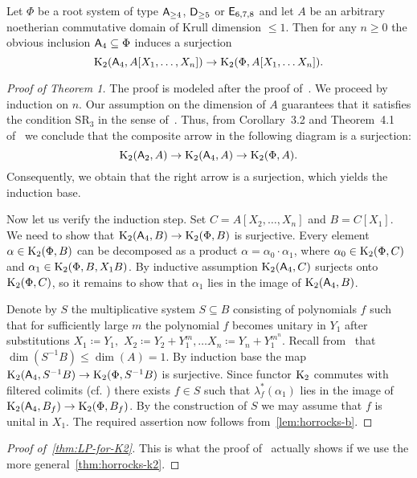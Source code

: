 \begin{thm}\label{thm:early-stability}
Let $\Phi$ be a root system of type $\mathsf{A}_{\geq 4}$, $\mathsf{D}_{\geq 5}$ or $\mathsf{E}_{6,7,8}$ and let $A$ be an arbitrary noetherian commutative
 domain of Krull dimension $\leq 1$.
Then for any $n \geq 0$ the obvious inclusion $\mathsf{A}_4 \subseteq \Phi$ induces a surjection
\[\operatorname{K}_2(\mathsf{A}_4, A[X_1,\ldots, X_n]) \to \operatorname{K}_2(\Phi, A[X_1, \ldots X_n]).\]
\end{thm}
\begin{proof}[Proof of Theorem 1]
    The proof is modeled after the proof of~\cite[Theorem~5.3]{Tu83}.
    We proceed by induction on $n$.
    Our assumption on the dimension of $A$ guarantees that it satisfies the condition $\mathrm{SR}_3$ in the sense of~\cite{St78}.
    Thus, from Corollary~3.2 and Theorem~4.1 of~\cite{St78} we conclude that the composite arrow in the following diagram is a surjection:
    \[\operatorname{K}_2(\mathsf{A}_2, A) \to \operatorname{K}_2(\mathsf{A}_4, A) \to \operatorname{K}_2(\Phi, A).\]
    Consequently, we obtain that the right arrow is a surjection, which yields the induction base.

    Now let us verify the induction step.
    Set $C = A[X_2, \ldots , X_n]$ and $B = C[X_1]$.
    We need to show that $\operatorname{K}_2(\mathsf{A}_4, B) \to \operatorname{K}_2(\Phi, B)$ is surjective.
    Every element $\alpha \in \operatorname{K}_2(\Phi, B)$ can be decomposed as a product $\alpha = \alpha_0 \cdot \alpha_1$,
      where $\alpha_0 \in \operatorname{K}_2(\Phi, C)$ and $\alpha_1 \in \operatorname{K}_2(\Phi, B, X_1 B)$.
    By inductive assumption $\operatorname{K}_2(\mathsf{A}_4, C)$ surjects onto $\operatorname{K}_2(\Phi, C)$, so it remains to show that $\alpha_1$ lies in the image of $\operatorname{K}_2(\mathsf{A}_4, B)$.

    Denote by $S$ the multiplicative system $S \subseteq B$ consisting of polynomials $f$ such that for sufficiently large $m$
    the polynomial $f$ becomes unitary in $Y_1$ after substitutions $X_1 \coloneqq Y_1,$ $X_2 \coloneqq Y_2 + Y_1^m, \ldots X_n \coloneqq Y_n + Y_1^{m^n}$.
    Recall from~\cite[\S~6]{Su77} that $\dim(S^{-1}B) \leq \dim(A) = 1$.
    By induction base the map $\operatorname{K}_2(\mathsf{A}_4, S^{-1}B) \to \operatorname{K}_2(\Phi, S^{-1}B)$ is surjective.
    Since functor $\operatorname{K}_2$ commutes with filtered colimits (cf. \cite[Lemma~3.3]{LSV2}) there exists $f \in S$ such that $\lambda^*_f(\alpha_1)$ lies in the image of $\operatorname{K}_2(\mathsf{A}_4, B_f) \to \operatorname{K}_2(\Phi, B_f)$.
    By the construction of $S$ we may assume that $f$ is unital in $X_1$.
    The required assertion now follows from~\cref{lem:horrocks-b}.
\end{proof}

\begin{proof}[Proof of~\cref{thm:LP-for-K2}]
    This is what the proof of~\cite[Theorem~1.1]{LSV2} actually shows if we use the more general~\cref{thm:horrocks-k2}.
\end{proof}

